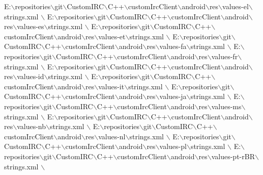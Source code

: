 \begin{DoxyCode}
E:\(\backslash\)repositories\(\backslash\)git\(\backslash\)CustomIRC\(\backslash\)C++\(\backslash\)customIrcClient\(\backslash\)android\(\backslash\)res\(\backslash\)values-el\(\backslash\)strings.xml \(\backslash\)
E:\(\backslash\)repositories\(\backslash\)git\(\backslash\)CustomIRC\(\backslash\)C++\(\backslash\)customIrcClient\(\backslash\)android\(\backslash\)res\(\backslash\)values-es\(\backslash\)strings.xml \(\backslash\)
E:\(\backslash\)repositories\(\backslash\)git\(\backslash\)CustomIRC\(\backslash\)C++\(\backslash\)customIrcClient\(\backslash\)android\(\backslash\)res\(\backslash\)values-et\(\backslash\)strings.xml \(\backslash\)
E:\(\backslash\)repositories\(\backslash\)git\(\backslash\)CustomIRC\(\backslash\)C++\(\backslash\)customIrcClient\(\backslash\)android\(\backslash\)res\(\backslash\)values-fa\(\backslash\)strings.xml \(\backslash\)
E:\(\backslash\)repositories\(\backslash\)git\(\backslash\)CustomIRC\(\backslash\)C++\(\backslash\)customIrcClient\(\backslash\)android\(\backslash\)res\(\backslash\)values-fr\(\backslash\)strings.xml \(\backslash\)
E:\(\backslash\)repositories\(\backslash\)git\(\backslash\)CustomIRC\(\backslash\)C++\(\backslash\)customIrcClient\(\backslash\)android\(\backslash\)res\(\backslash\)values-id\(\backslash\)strings.xml \(\backslash\)
E:\(\backslash\)repositories\(\backslash\)git\(\backslash\)CustomIRC\(\backslash\)C++\(\backslash\)customIrcClient\(\backslash\)android\(\backslash\)res\(\backslash\)values-it\(\backslash\)strings.xml \(\backslash\)
E:\(\backslash\)repositories\(\backslash\)git\(\backslash\)CustomIRC\(\backslash\)C++\(\backslash\)customIrcClient\(\backslash\)android\(\backslash\)res\(\backslash\)values-ja\(\backslash\)strings.xml \(\backslash\)
E:\(\backslash\)repositories\(\backslash\)git\(\backslash\)CustomIRC\(\backslash\)C++\(\backslash\)customIrcClient\(\backslash\)android\(\backslash\)res\(\backslash\)values-ms\(\backslash\)strings.xml \(\backslash\)
E:\(\backslash\)repositories\(\backslash\)git\(\backslash\)CustomIRC\(\backslash\)C++\(\backslash\)customIrcClient\(\backslash\)android\(\backslash\)res\(\backslash\)values-nb\(\backslash\)strings.xml \(\backslash\)
E:\(\backslash\)repositories\(\backslash\)git\(\backslash\)CustomIRC\(\backslash\)C++\(\backslash\)customIrcClient\(\backslash\)android\(\backslash\)res\(\backslash\)values-nl\(\backslash\)strings.xml \(\backslash\)
E:\(\backslash\)repositories\(\backslash\)git\(\backslash\)CustomIRC\(\backslash\)C++\(\backslash\)customIrcClient\(\backslash\)android\(\backslash\)res\(\backslash\)values-pl\(\backslash\)strings.xml \(\backslash\)
E:\(\backslash\)repositories\(\backslash\)git\(\backslash\)CustomIRC\(\backslash\)C++\(\backslash\)customIrcClient\(\backslash\)android\(\backslash\)res\(\backslash\)values-pt-rBR\(\backslash\)strings.xml \(\backslash\)

\end{DoxyCode}
